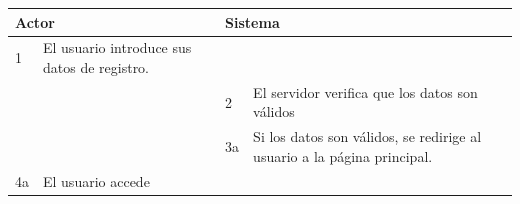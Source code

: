 \begin{itemize}
\begin{itemize}
\begin{table}[H]
\begin{tabularx}{\textwidth}{|l|X|l|X|}
        \multicolumn{2}{|l|}{\cellcolor[HTML]{EFEFEF}Actor} & \multicolumn{2}{l|}{\cellcolor[HTML]{EFEFEF}Sistema} \\ \hline
        1                         & El usuario introduce sus datos de registro.                        &                            &                         \\ \hline
                                  &                         & 2                          & El servidor verifica que los datos son válidos                       \\ \hline
                                  &                         & 3a                          & Si los datos son válidos, se redirige al usuario a la página principal.                        \\ \hline
        4a                        & El usuario accede       &                          &                        \\ \hline
                                  

\end{tabularx}
\end{table}
\end{itemize}
\end{itemize}
